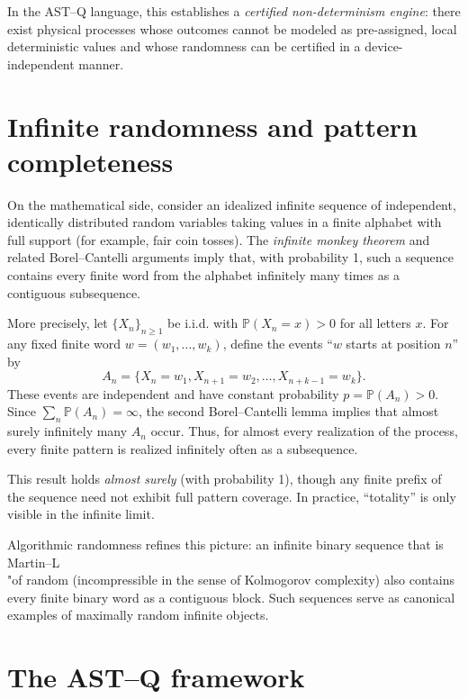 \documentclass[11pt]{article}
\begin{document}
In the AST--Q language, this establishes a \emph{certified non-determinism engine}: there exist physical processes whose outcomes cannot be modeled as pre-assigned, local deterministic values and whose randomness can be certified in a device-independent manner.

\section{Infinite randomness and pattern completeness}

On the mathematical side, consider an idealized infinite sequence of independent, identically distributed random variables taking values in a finite alphabet with full support (for example, fair coin tosses). The \emph{infinite monkey theorem} and related Borel--Cantelli arguments imply that, with probability 1, such a sequence contains every finite word from the alphabet infinitely many times as a contiguous subsequence.

More precisely, let $\{X_n\}_{n\ge 1}$ be i.i.d. with $\mathbb{P}(X_n = x) > 0$ for all letters $x$. For any fixed finite word $w = (w_1,\dots,w_k)$, define the events ``$w$ starts at position $n$'' by
\begin{equation}
A_n = \{ X_n = w_1, X_{n+1} = w_2, \dots, X_{n+k-1} = w_k \}.
\end{equation}
These events are independent and have constant probability $p = \mathbb{P}(A_n) > 0$. Since $\sum_n \mathbb{P}(A_n) = \infty$, the second Borel--Cantelli lemma implies that almost surely infinitely many $A_n$ occur. Thus, for almost every realization of the process, every finite pattern is realized infinitely often as a subsequence.

This result holds \emph{almost surely} (with probability 1), though any finite prefix of the sequence need not exhibit full pattern coverage. In practice, ``totality'' is only visible in the infinite limit.

Algorithmic randomness refines this picture: an infinite binary sequence that is Martin--L\\"of random (incompressible in the sense of Kolmogorov complexity) also contains every finite binary word as a contiguous block. Such sequences serve as canonical examples of maximally random infinite objects.

\section{The AST--Q framework}
\end{document}
